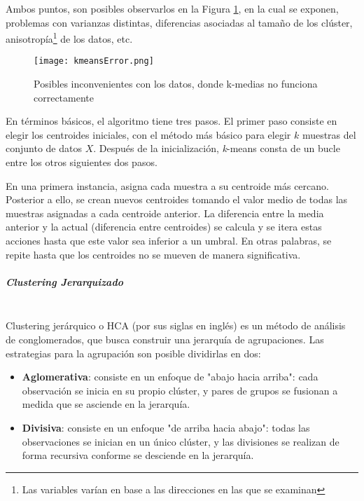 Ambos puntos, son posibles observarlos en la Figura  \ref{kerror}, en la cual se exponen, problemas con varianzas distintas, diferencias asociadas al tamaño de los clúster, anisotropía\footnote{Las variables varían en base a las direcciones en las que se examinan} de los datos, etc.

\begin{figure}[!h]
	
	\centering
	\texttt{[image: kmeansError.png]}
	\caption{Posibles inconvenientes con los datos, donde k-medias  no funciona correctamente}
	\label{kerror}
\end{figure}


En términos básicos, el algoritmo tiene tres pasos. El primer paso consiste en elegir los centroides iniciales, con el método más básico para elegir $k$ muestras del conjunto de datos $X$. Después de la inicialización, \textit{k}-means  consta de un bucle entre los otros siguientes dos pasos. 

En una primera instancia, asigna cada muestra a su centroide más cercano. Posterior a ello, se crean nuevos centroides tomando el valor medio de todas las muestras asignadas a cada centroide anterior. La diferencia entre la media anterior y la actual (diferencia entre centroides) se calcula y se itera estas acciones hasta que este valor sea inferior a un umbral. En otras palabras, se repite hasta que los centroides no se mueven de manera significativa.

\subparagraph{Clustering Jerarquizado\\\\}

Clustering jerárquico o HCA (por sus siglas en inglés) es un método de análisis de conglomerados, que busca construir una jerarquía de agrupaciones. Las estrategias para la agrupación son posible dividirlas en dos:

\begin{itemize}
	
	\item \textbf{Aglomerativa}: consiste en un enfoque de "abajo hacia arriba": cada observación se inicia en su propio clúster, y pares de grupos se fusionan a medida que se asciende en la jerarquía. 
	
	\item \textbf{Divisiva}: consiste en un enfoque "de arriba hacia abajo": todas las observaciones se inician en un único clúster, y las divisiones se realizan de forma recursiva conforme se desciende en la jerarquía.
	
\end{itemize}

